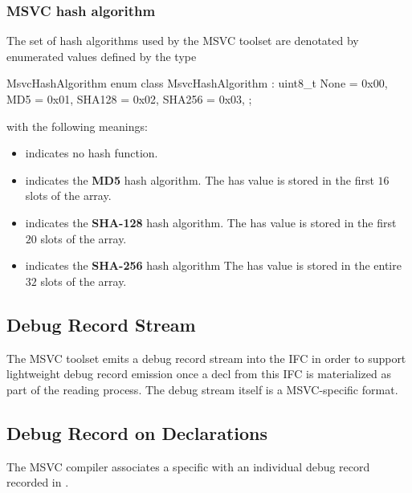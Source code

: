 

\subsubsection{MSVC hash algorithm}

The set of hash algorithms used by the MSVC toolset are denotated by enumerated values defined 
by the type 
%
\begin{typedef}{MsvcHashAlgorithm}{}
	enum class MsvcHashAlgorithm : uint8_t {
		None = 0x00,
		MD5 = 0x01,
		SHA128 = 0x02,
		SHA256 = 0x03,
	};
\end{typedef}
%
with the following meanings:
\begin{itemize}
	\item {} indicates no hash function.
	\item {} indicates the \textbf{MD5} hash algorithm.  
	The has value is stored in the first $16$ slots of the  array.
	\item {} indicates the \textbf{SHA-128} hash algorithm.
	The has value is stored in the first $20$ slots of the  array.
	\item {} indicates the \textbf{SHA-256} hash algorithm 
	The has value is stored in the entire $32$ slots of the  array.
\end{itemize}


\subsection{Debug Record Stream}
\label{sec:ifc-msvc-debug-record-stream-trait}

The MSVC toolset emits a debug record stream into the IFC in order to support lightweight debug record emission once
a decl from this IFC is materialized as part of the reading process.  The debug stream itself is a MSVC-specific format.



\subsection{Debug Record on Declarations}
\label{sec:ifc-msvc-debug-record-trait}

The MSVC compiler associates a specific  with an individual debug record recorded in .

